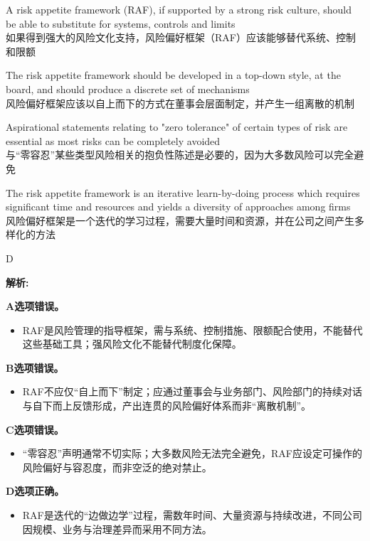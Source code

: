 \documentclass{article}
\newenvironment{explanation}
{\textbf{解析:}\par}
{\par}
\begin{document}
\begin{choices}
    \item A risk appetite framework (RAF), if supported by a strong risk culture, should be able to substitute for systems, controls and limits
    \\如果得到强大的风险文化支持，风险偏好框架（RAF）应该能够替代系统、控制和限额
    \item The risk appetite framework should be developed in a top-down style, at the board, and should produce a discrete set of mechanisms
    \\风险偏好框架应该以自上而下的方式在董事会层面制定，并产生一组离散的机制
    \item Aspirational statements relating to "zero tolerance" of certain types of risk are essential as most risks can be completely avoided
    \\与“零容忍”某些类型风险相关的抱负性陈述是必要的，因为大多数风险可以完全避免
    \item The risk appetite framework is an iterative learn-by-doing process which requires significant time and resources and yields a diversity of approaches among firms
    \\风险偏好框架是一个迭代的学习过程，需要大量时间和资源，并在公司之间产生多样化的方法
\end{choices}

\begin{correctanswer}
    D
\end{correctanswer}

\begin{explanation}
    \textbf{A选项错误。}
    \begin{itemize}
        \item RAF是风险管理的指导框架，需与系统、控制措施、限额配合使用，不能替代这些基础工具；强风险文化不能替代制度化保障。
    \end{itemize}

    \textbf{B选项错误。}
    \begin{itemize}
        \item RAF不应仅“自上而下”制定；应通过董事会与业务部门、风险部门的持续对话与自下而上反馈形成，产出连贯的风险偏好体系而非“离散机制”。
    \end{itemize}

    \textbf{C选项错误。}
    \begin{itemize}
        \item “零容忍”声明通常不切实际；大多数风险无法完全避免，RAF应设定可操作的风险偏好与容忍度，而非空泛的绝对禁止。
    \end{itemize}

    \textbf{D选项正确。}
    \begin{itemize}
        \item RAF是迭代的“边做边学”过程，需数年时间、大量资源与持续改进，不同公司因规模、业务与治理差异而采用不同方法。
    \end{itemize}
\end{explanation}
\end{document}
